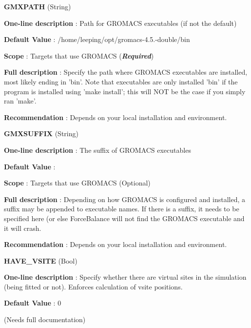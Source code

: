 \begin{DoxyItemize}
\item {\bfseries  \-G\-M\-X\-P\-A\-T\-H } (\-String) \par
{\bfseries  \-One-\/line description }\-: \-Path for \-G\-R\-O\-M\-A\-C\-S executables (if not the default) \par
{\bfseries  \-Default \-Value }\-: /home/leeping/opt/gromacs-\/4.5.-\/double/bin \par
{\bfseries  \-Scope }\-: \-Targets that use \-G\-R\-O\-M\-A\-C\-S ({\bfseries {\itshape \-Required\/}}) \par
{\bfseries  \-Full description }\-: \-Specify the path where \-G\-R\-O\-M\-A\-C\-S executables are installed, most likely ending in 'bin'. \-Note that executables are only installed 'bin' if the program is installed using 'make install'; this will \-N\-O\-T be the case if you simply ran 'make'. \par
{\bfseries  \-Recommendation }\-: \-Depends on your local installation and environment.\end{DoxyItemize}
\begin{DoxyItemize}
\item {\bfseries  \-G\-M\-X\-S\-U\-F\-F\-I\-X } (\-String) \par
{\bfseries  \-One-\/line description }\-: \-The suffix of \-G\-R\-O\-M\-A\-C\-S executables \par
{\bfseries  \-Default \-Value }\-: \par
{\bfseries  \-Scope }\-: \-Targets that use \-G\-R\-O\-M\-A\-C\-S (\-Optional) \par
{\bfseries  \-Full description }\-: \-Depending on how \-G\-R\-O\-M\-A\-C\-S is configured and installed, a suffix may be appended to executable names. \-If there is a suffix, it needs to be specified here (or else \-Force\-Balance will not find the \-G\-R\-O\-M\-A\-C\-S executable and it will crash. \par
{\bfseries  \-Recommendation }\-: \-Depends on your local installation and environment.\end{DoxyItemize}
\begin{DoxyItemize}
\item {\bfseries  \-H\-A\-V\-E\-\_\-\-V\-S\-I\-T\-E } (\-Bool) \par
{\bfseries  \-One-\/line description }\-: \-Specify whether there are virtual sites in the simulation (being fitted or not). \-Enforces calculation of vsite positions. \par
{\bfseries  \-Default \-Value }\-: 0 \par
(\-Needs full documentation)\end{DoxyItemize}
